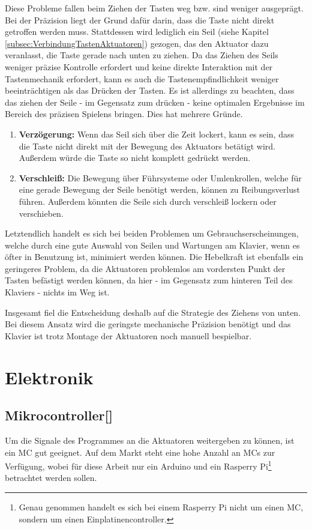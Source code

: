 Diese Probleme fallen beim Ziehen der Tasten weg bzw. sind weniger ausgeprägt.
Bei der Präzision liegt der Grund dafür darin, dass die Taste nicht
direkt getroffen werden muss. Stattdessen wird lediglich ein Seil (siehe Kapitel \ref{subsec:VerbindungTastenAktuatoren})
gezogen, das den Aktuator dazu veranlasst, die Taste
gerade nach unten zu ziehen.
Da das Ziehen des Seils weniger präzise Kontrolle erfordert
und keine direkte Interaktion mit der Tastenmechanik erfordert, kann es auch die Tastenempfindlichkeit weniger beeinträchtigen
als das Drücken der Tasten. Es ist allerdings zu beachten, dass das ziehen der Seile - im Gegensatz zum drücken - keine
optimalen Ergebnisse im Bereich des präzisen Spielens bringen. Dies hat mehrere Gründe.
\begin{enumerate}
	\item \textbf{Verzögerung:} Wenn das Seil sich über die Zeit lockert, kann es sein, dass die Taste nicht direkt mit der Bewegung des Aktuators betätigt wird. Außerdem würde die Taste so nicht komplett gedrückt werden.
	\item \textbf{Verschleiß:} Die Bewegung über Führsysteme oder Umlenkrollen, welche für eine gerade Bewegung der Seile benötigt werden, können zu Reibungsverlust führen. Außerdem könnten die Seile sich durch verschleiß lockern oder verschieben.
\end{enumerate}
Letztendlich handelt es sich bei beiden Problemen um Gebrauchserscheinungen, welche durch eine gute Auswahl von Seilen
und Wartungen am Klavier, wenn es öfter in Benutzung ist, minimiert werden können.
Die Hebelkraft ist ebenfalls ein geringeres Problem, da die Aktuatoren problemlos am vordersten Punkt der Tasten
befästigt werden können, da hier - im Gegensatz zum hinteren Teil des Klaviers - nichts im Weg ist.

Insgesamt fiel die Entscheidung deshalb auf die Strategie des Ziehens von unten.
Bei diesem Ansatz wird die geringste mechanische Präzision benötigt und das Klavier ist trotz Montage der Aktuatoren noch manuell bespielbar.

\section{Elektronik}\label{sec:konzeptionhw-elektronik}

\subsection{Mikrocontroller[\cite*[siehe: ]{ArduinoVsRaspberry2022}]}\label{Ansteuerung}
Um die Signale des Programmes an die Aktuatoren weitergeben zu können, ist ein \acf{MC} gut geeignet.
Auf dem Markt steht eine hohe Anzahl an \ac{MC}s zur Verfügung,
wobei für diese Arbeit nur ein Arduino und ein Rasperry Pi\footnote{Genau genommen handelt es sich bei einem Rasperry Pi nicht um einen \ac{MC}, sondern um einen Einplatinencontroller.} betrachtet werden sollen.

